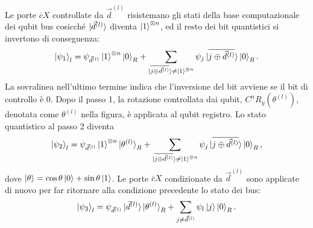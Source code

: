 Le porte $\overline{c}X$ controllate da $\vec{d}^{(l)}$ risistemano gli stati 
della base computazionale dei qubit bus cosicché $\ket{\vec{d}^{(l)}}$ diventa 
$\ket{1}^{\otimes n}$, ed il resto dei bit quantistici si invertono di conseguenza: 
\begin{equation}
    \ket{\psi_1}_l = \psi_{\vec{d}^{(l)}}\ket{1}^{\otimes n} \ket{0}_R + 
    \sum_{\ket{\overline{j \oplus \vec{d}^{(l)}}} \neq \ket{1}^{\otimes n} } \psi_j \ket{\overline{j \oplus \vec{d}^{(l)}}} 
    \ket{0}_R.
\end{equation}
La sovralinea nell'ultimo termine indica che l'inversione del bit avviene se il 
bit di controllo è 0. Dopo il passo 1, la rotazione controllata dai qubit, 
$C^n R_y(\theta^{(l)})$, denotata come $\theta^{(l)}$ nella figura, è applicata 
al qubit registro. Lo stato quantistico al passo 2 diventa 
\begin{equation}
    \ket{\psi_2}_l = \psi_{\vec{d}^{(l)}} \ket{1}^{\otimes n} \ket{\theta^{(l)}}_R + 
    \sum_{\ket{\overline{j \oplus \vec{d}^{(l)}}} \neq \ket{1}^{\otimes n} } \psi_j \ket{\overline{j \oplus \vec{d}^{(l)}}} 
    \ket{0}_R,
\end{equation}
dove $\ket{\theta}=\cos\theta\ket{0}+\sin\theta\ket{1}$. 
Le porte $\overline{c}X$ condizionate da $\vec{d}^{(l)}$ sono applicate di nuovo 
per far ritornare alla condizione precedente lo stato dei bus: 
\begin{equation}
    \ket{\psi_3}_l = \psi_{\vec{d}^{(l)}} \ket{\vec{d}^{(l)}} \ket{\theta^{(l)}}_R + 
    \sum_{j \neq \vec{d}^{(l)}} \psi_l \ket{j} \ket{0}_R.
\end{equation}

